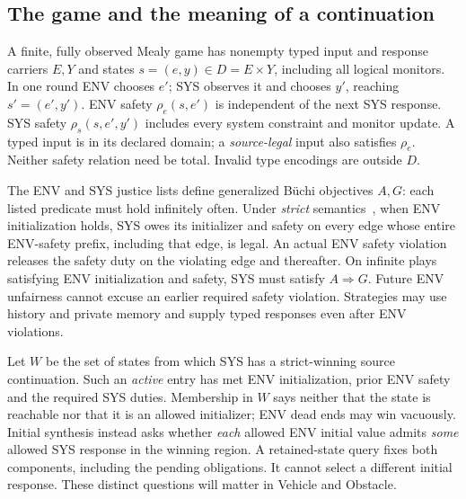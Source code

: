 \subsection{The game and the meaning of a continuation}\label{sec:semantics}
A finite, fully observed Mealy game has nonempty typed input and response
carriers $E,Y$ and states $s=(e,y)\in D=E\times Y$, including all logical
monitors. In one round ENV chooses $e'$; SYS observes it and chooses $y'$,
reaching $s'=(e',y')$. ENV safety $\rho_e(s,e')$ is independent of the next
SYS response. SYS safety $\rho_s(s,e',y')$ includes every system constraint
and monitor update. A typed input is in its declared domain; a
\emph{source-legal} input also satisfies $\rho_e$. Neither safety relation
need be total. Invalid type encodings are outside $D$.

The ENV and SYS justice lists define generalized B\"uchi objectives $A,G$:
each listed predicate must hold infinitely often. Under \emph{strict}
semantics~\cite{gr1,kind}, when ENV initialization holds, SYS owes its
initializer and safety on every edge whose entire ENV-safety prefix,
including that edge, is legal. An actual ENV safety violation releases the safety duty on the violating
edge and thereafter. On infinite plays satisfying
ENV initialization and safety, SYS must satisfy $A\Rightarrow G$.
Future ENV unfairness cannot excuse an earlier required safety violation.
Strategies may use history and private memory and supply typed responses
even after ENV violations.

Let $W$ be the set of states from which SYS has a strict-winning source
continuation. Such an \emph{active} entry has met ENV initialization, prior
ENV safety and the required SYS duties. Membership in $W$ says neither that
the state is reachable nor that it is an allowed initializer; ENV dead ends
may win vacuously. Initial synthesis instead asks whether \emph{each} allowed
ENV initial value admits \emph{some} allowed SYS response in the winning
region. A retained-state query fixes both components, including the pending
obligations. It cannot select a different initial response. These distinct
questions will matter in Vehicle and Obstacle.
